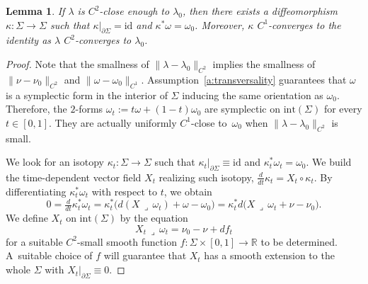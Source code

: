 \documentclass[JEP,XML,SOM,Unicode,published]{cedram}
\let\mathds\mathbb
\newtheorem{lem}[thm]{Lemma}
\theoremstyle{definition}
\newcommand{\id}{\mathrm{id}}
\newcommand{\R}{\mathds{R}}
\let\diff d
\begin{document}
\begin{lem}
\label{l:pullback_to_nu0}
If $\lambda$ is $C^2$-close enough to $\lambda_0$, then there exists a diffeomorphism $\kappa:\Sigma\to\Sigma$ such that $\kappa|_{\partial\Sigma}=\id$ and $\kappa^*\omega=\omega_0$. Moreover, $\kappa$ $C^1$-converges to the identity as $\lambda$ $C^2$-converges to $\lambda_0$.
\end{lem}

\begin{proof}
Note that the smallness of $\|\lambda-\lambda_0\|_{C^2}$ implies the smallness of $\|\nu-\nu_0\|_{C^2}$ and $\|\omega-\omega_0\|_{C^1}$. Assumption~\ref{a:transversality} guarantees that $\omega$ is a symplectic form in the interior of $\Sigma$ inducing the same orientation as $\omega_0$. Therefore, the $2$-forms $\omega_t:=t\omega+(1-t)\omega_0$ are symplectic on $\mathrm{int}(\Sigma)$ for every $t\in[0,1]$. They are actually uniformly $C^1$-close to~$\omega_0$ when $\|\lambda-\lambda_0\|_{C^2}$ is small.

We look for an isotopy $\kappa_t:\Sigma\to\Sigma$ such that $\kappa_t|_{\partial\Sigma}\equiv\mathrm{id}$ and $\kappa_t^*\omega_t=\omega_0$. We build the time-dependent vector field $X_t$ realizing such isotopy, \ie $\tfrac{\diff}{\diff t}\kappa_t=X_t\circ\kappa_t$. By differentiating $\kappa_t^*\omega_t$ with respect to $t$, we obtain
\begin{equation}
\label{e:X_Moser_0}
0=\tfrac{\diff}{\diff t}\kappa_t^*\omega_t
=
\kappa_t^* \big( \diff(X\,\lrcorner\,\omega_t) + \omega-\omega_0 \big)
=
\kappa_t^* \diff\big(X\,\lrcorner\,\omega_t + \nu-\nu_0 \big) .
\end{equation}
We define $X_t$ on $\mathrm{int}(\Sigma)$ by the equation
\begin{equation}
\label{e:X_Moser}
X_t\,\lrcorner\,\omega_t = \nu_0 - \nu + \diff f_t
\end{equation}
for a suitable $C^2$-small smooth function $f:\Sigma\times [0,1] \to\R$ to be determined. A~suitable choice of $f$ will guarantee that $X_t$ has a smooth extension to the whole $\Sigma$ with $X_t|_{\partial\Sigma}\equiv0$.


\end{proof}
\end{document}
